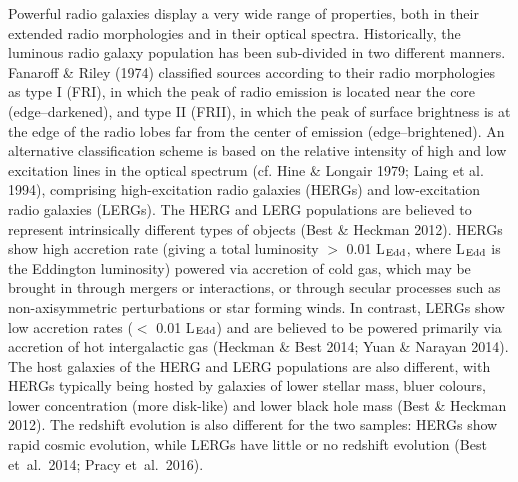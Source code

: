 \documentclass[usenatbib]{mn2e}
\begin{document}
Powerful radio galaxies display a very wide range of properties, both in
their extended radio morphologies and in their optical
spectra. Historically, the luminous radio galaxy population has been
sub-divided in two different manners. Fanaroff \& Riley (1974) classified
sources according to their radio morphologies as type I (FRI), in which
the peak of radio emission is located near the core (edge--darkened), and
type II (FRII), in which the peak of surface brightness is at the edge of
the radio lobes far from the center of emission (edge--brightened). An
alternative classification scheme is based on the relative intensity of
high and low excitation lines in the optical spectrum (cf. Hine \& Longair
1979; Laing et al. 1994), comprising high-excitation radio galaxies
(HERGs) and low-excitation radio galaxies (LERGs). The HERG and LERG
populations are believed to represent intrinsically different types of
objects (Best \& Heckman 2012). HERGs show high accretion rate (giving a
total luminosity $>$ 0.01 L$_{\rm Edd}$, where L$_{\rm Edd}$ is the
Eddington luminosity) powered via accretion of cold gas, which may be
brought in through mergers or interactions, or through secular processes
such as non-axisymmetric perturbations or star forming winds. In contrast,
LERGs show low accretion rates ($<$ 0.01 L$_{\rm Edd}$) and are believed to be
powered primarily via accretion of hot intergalactic gas (Heckman \& Best
2014; Yuan \& Narayan 2014). The host galaxies of the HERG and LERG
populations are also different, with HERGs typically being hosted by
galaxies of lower stellar mass, bluer colours, lower concentration (more
disk-like) and lower black hole mass (Best \& Heckman 2012). The redshift
evolution is also different for the two samples: HERGs show rapid cosmic
evolution, while LERGs have little or no redshift evolution (Best
et~al.\ 2014; Pracy et~al.\ 2016).
\end{document}
